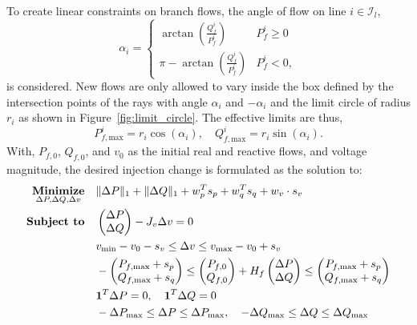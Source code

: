 \documentclass[12pt]{article}
\numberwithin{equation}{section}
\numberwithin{table}{section}
\numberwithin{figure}{section}
\begin{document}
To create linear constraints on branch flows, the angle of flow on line $i\in\mathcal{I}_l$,
\begin{equation}
	\alpha_i = \begin{cases} 
		\arctan\left(\frac{Q_f^{i}}{P_f^{i}}\right) & P_f^{i} \geq 0 \\
		\pi - \arctan\left(\frac{Q_f^{i}}{P_f^{i}}\right) & P_f^{i} < 0,
		\end{cases}
\end{equation}
is considered.
New flows are only allowed to vary inside the box defined by the intersection points of the rays with angle $\alpha_i$ and $-\alpha_i$ and the limit circle of radius $r_{i}$ as shown in Figure~\ref{fig:limit_circle}.
The effective limits are thus,
\begin{equation}
	P_{f,\text{max}}^{i}= r_{i}\cos(\alpha_{i}), \quad Q_{f,\text{max}}^{i} = r_{i}\sin(\alpha_{i}).
\end{equation}
With, $P_{f,0}$, $Q_{f,0}$, and $v_0$ as the initial real and reactive flows, and voltage magnitude, the desired injection  change is formulated as the solution to:
\begin{subequations}
\begin{align}
\underset{\Delta P, \Delta Q, \Delta v}{\text{\bfseries Minimize}} \quad  & \| \Delta P \|_1 + \| \Delta Q \|_1 + w_p^Ts_p + w_q^Ts_q + w_v\cdot s_v \\
\text{\bfseries Subject to} \quad & \begin{pmatrix} \Delta P \\ \Delta Q \end{pmatrix} - J_v \Delta v = 0\\ 
 						& v_{\text{min}} - v_0 - s_v \leq \Delta v \leq v_{\text{max}} - v_0 + s_v \\
						&-\begin{pmatrix} P_{f,\text{max}} + s_p \\ Q_{f,\text{max}} + s_q \end{pmatrix}\leq \begin{pmatrix} P_{f,0} \\ Q_{f,0} \end{pmatrix} + H_f \begin{pmatrix} \Delta P \\ \Delta Q \end{pmatrix} \leq \begin{pmatrix} P_{f,\text{max}} + s_p \\ Q_{f,\text{max}} + s_q \end{pmatrix} \\
						& \mathbf{1}^T \Delta P = 0, \quad \mathbf{1}^T \Delta Q = 0 \label{eq:delta_inj_sum0}\\
						& -\Delta P_{\text{max}}\leq \Delta P \leq \Delta P_{\text{max}}, \quad -\Delta Q_{\text{max}}\leq \Delta Q \leq \Delta Q_{\text{max}} \label{eq:delta_inj_max}
\end{align}
\end{subequations}
\end{document}
